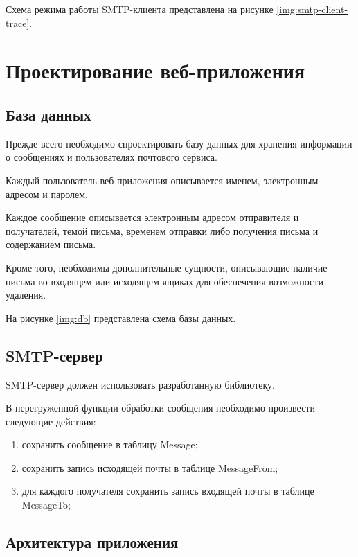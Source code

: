Схема режима работы SMTP-клиента представлена на рисунке \ref{img:smtp-client-trace}.


\section{Проектирование веб-приложения}

\subsection{База данных}

Прежде всего необходимо спроектировать базу данных для хранения информации о сообщениях и пользователях почтового сервиса.

Каждый пользователь веб-приложения описывается именем, электронным адресом и паролем.

Каждое сообщение описывается электронным адресом отправителя и получателей, темой письма, временем отправки либо получения письма и содержанием письма.

Кроме того, необходимы дополнительные сущности, описывающие наличие письма во входящем или исходящем ящиках для обеспечения возможности удаления.

На рисунке \ref{img:db} представлена схема базы данных.


\subsection{SMTP-сервер}

SMTP-сервер должен использовать разработанную библиотеку.

В перегруженной функции обработки сообщения необходимо произвести следующие действия:
\begin{enumerate}
	\item сохранить сообщение в таблицу Message;
	\item сохранить запись исходящей почты в таблице MessageFrom;
	\item для каждого получателя сохранить запись входящей почты в таблице MessageTo;
\end{enumerate}

\subsection{Архитектура приложения}

